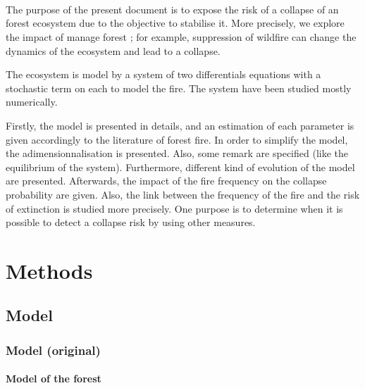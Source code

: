 \documentclass{article}
\begin{document}
\paragraph{\\}

The purpose of the present document is to expose the risk of a collapse of an forest ecosystem due to the objective to stabilise it. More precisely, we explore the impact of manage forest ; for example, suppression of wildfire can change the dynamics of the ecosystem and lead to a collapse.

The ecosystem is model by a system of two differentials equations with a stochastic term on each to model the fire. The system have been studied mostly numerically.

Firstly, the model is presented in details, and an estimation of each parameter is given accordingly to the literature of forest fire. In order to simplify the model, the adimensionnalisation is presented. Also, some remark are specified (like the equilibrium of the system). Furthermore, different kind of evolution of the model are presented. Afterwards, the impact of the fire frequency on the collapse probability are given. Also, the link between the frequency of the fire and the risk of extinction is studied more precisely. One purpose is to determine when it is possible to detect a collapse risk by using other measures.





\newpage
\section{Methods}


\subsection{Model}

\subsubsection{Model (original)}

\paragraph{Model of the forest}
\end{document}
